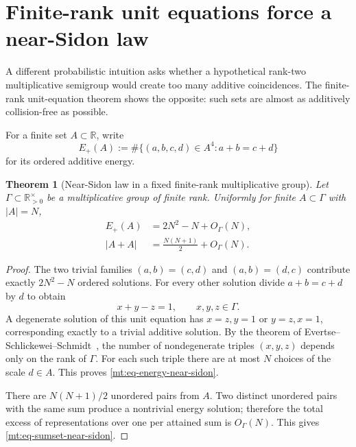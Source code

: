 \documentclass[11pt,oneside]{article}
\newtheorem{theorem}{Theorem}[section]
\theoremstyle{definition}
\theoremstyle{remark}
\newcommand{\R}{\mathbb R}
\begin{document}
\section{Finite-rank unit equations force a near-Sidon law}
\label{mt:sec-sumproduct}

A different probabilistic intuition asks whether a hypothetical rank-two multiplicative
semigroup would create too many additive coincidences.  The finite-rank unit-equation theorem
shows the opposite: such sets are almost as additively collision-free as possible.

For a finite set $A\subset\R$, write
\begin{equation}
 E_+(A):=\#\{(a,b,c,d)\in A^4:a+b=c+d\}
 \label{mt:eq-additive-energy}
\end{equation}
for its ordered additive energy.

\begin{theorem}[Near-Sidon law in a fixed finite-rank multiplicative group]
\label{mt:thm-near-sidon}
Let $\Gamma\subset\R_{>0}^{\times}$ be a multiplicative group of finite rank.  Uniformly for
finite $A\subset\Gamma$ with $|A|=N$,
\begin{align}
 E_+(A)&=2N^2-N+O_\Gamma(N),
 \label{mt:eq-energy-near-sidon}\\
 |A+A|&=\frac{N(N+1)}2+O_\Gamma(N).
 \label{mt:eq-sumset-near-sidon}
\end{align}
\end{theorem}

\begin{proof}
The two trivial families $(a,b)=(c,d)$ and $(a,b)=(d,c)$ contribute exactly $2N^2-N$ ordered
solutions.  For every other solution divide $a+b=c+d$ by $d$ to obtain
\begin{equation}
 x+y-z=1,
 \qquad x,y,z\in\Gamma.
 \label{mt:eq-unit-equation-three}
\end{equation}
A degenerate solution of this unit equation has $x=z,y=1$ or $y=z,x=1$, corresponding exactly
to a trivial additive solution.  By the theorem of Evertse--Schlickewei--Schmidt~\cite{EvertseSchlickeweiSchmidt2002}, the number of
nondegenerate triples $(x,y,z)$ depends only on the rank of $\Gamma$.  For each such triple
there are at most $N$ choices of the scale $d\in A$.  This proves
\eqref{mt:eq-energy-near-sidon}.

There are $N(N+1)/2$ unordered pairs from $A$.  Two distinct unordered pairs with the same sum
produce a nontrivial energy solution; therefore the total excess of representations over
one per attained sum is $O_\Gamma(N)$.  This gives \eqref{mt:eq-sumset-near-sidon}.
\end{proof}
\end{document}
